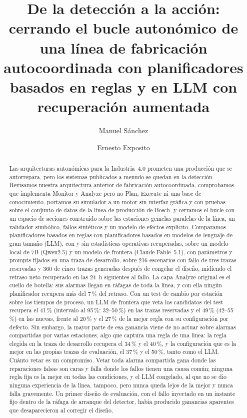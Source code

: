 \documentclass[preprint,11pt]{elsarticle}
\begin{document}
\begin{frontmatter}

\title{De la detección a la acción: cerrando el bucle autonómico de una línea de fabricación autocoordinada con planificadores basados en reglas y en LLM con recuperación aumentada}

\author[a,b]{Manuel S\'anchez}
\author[b]{Ernesto Exposito}
\address[a]{Universidad Nacional Experimental del T\'achira, San Crist\'obal, Venezuela}
\address[b]{Univ Pau \& Pays Adour / E2S UPPA, Laboratoire d'informatique de l'Universit\'e de Pau et des Pays de l'Adour (LIUPPA), EA3000, 64000 Pau, Francia}

\begin{abstract}
Las arquitecturas autonómicas para la Industria~4.0 prometen una producción que se autorrepara, pero los sistemas publicados a menudo se quedan en la detección. Revisamos nuestra arquitectura anterior de fabricación autocoordinada, comprobamos que implementa Monitor y Analyze pero no Plan, Execute ni una base de conocimiento, portamos su simulador a un motor sin interfaz gráfica y con pruebas sobre el conjunto de datos de la línea de producción de Bosch, y cerramos el bucle con un espacio de acciones construido sobre las estaciones gemelas paralelas de la línea, un validador simbólico, fallos sintéticos y un modelo de efectos explícito. Comparamos planificadores basados en reglas con planificadores basados en modelos de lenguaje de gran tamaño (LLM), con y sin estadísticas operativas recuperadas, sobre un modelo local de 7B (Qwen2.5) y un modelo de frontera (Claude Fable~5.1), con parámetros y prompts fijados en una traza de desarrollo, sobre 216 escenarios con fallo de tres trazas reservadas y 360 de cinco trazas generadas después de congelar el diseño, midiendo el retraso neto recuperado en las 24~h siguientes al fallo. La capa Analyze original es el cuello de botella: sus alarmas llegan en ráfagas de toda la línea, y con ella ningún planificador recupera más del 7\,\% del retraso. Con un test de cambio por estación sobre los tiempos de proceso, un LLM de frontera que veta los candidatos del test recupera el 41\,\% (intervalo al 95\,\%: 32--50\,\%) en las trazas reservadas y el 49\,\% (42--55\,\%) en las nuevas, frente al 20\,\% y el 27\,\% de la mejor regla con su configuración por defecto. Sin embargo, la mayor parte de esa ganancia viene de no actuar sobre alarmas compartidas por varias estaciones, algo que captura una regla de una línea: la regla elegida en la traza de desarrollo recupera el 34\,\% y el 40\,\%, y la configuración que es la mejor en las propias trazas de evaluación, el 37\,\% y el 50\,\%, tanto como el LLM. Cuánto vetar es un compromiso. Vetar toda alarma compartida gana donde las reparaciones falsas son caras y falla donde los fallos tienen una causa común; ninguna regla fija es la mejor en todas las condiciones, y el LLM congelado, al que no se dio ninguna experiencia de la línea, tampoco, pero nunca queda lejos de la mejor y nunca falla gravemente. Un primer diseño de evaluación, con el fallo inyectado en un instante fijo dentro de la ráfaga de arranque del detector, había producido ganancias aparentes que desaparecieron al corregir el diseño.

\end{abstract}
\end{frontmatter}
\end{document}
